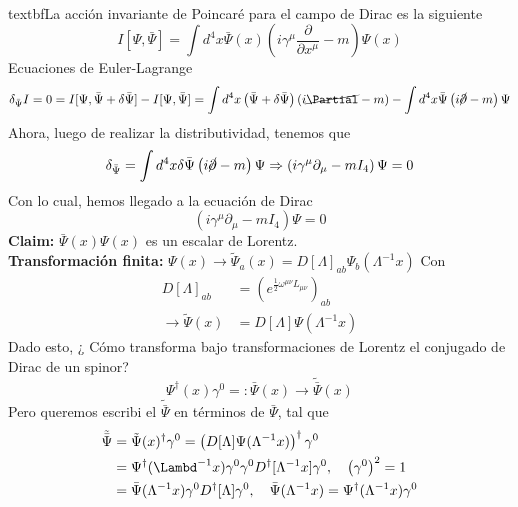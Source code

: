 \documentclass[../main.tex]{subfiles}
\begin{document}
 \\
 textbf{La acción invariante de Poincaré para el campo de Dirac es la siguiente}
 \begin{equation}
   \boxed{ I[\Psi, \bar{\Psi}] = \int d^4 x \bar{\Psi}(x) \left( i\gamma^\mu \frac{\partial}{\partial x^\mu} - m \right)\Psi(x) }
  \end{equation}
  Ecuaciones de Euler-Lagrange
  \begin{equation}
    \delta_{\bar{\Psi}} I = 0 = I[\Psi, \bar{\Psi} + \delta \bar{\Psi}] - I[\Psi,\bar{\Psi}] = \int d^4x \left( \bar{\Psi} + \delta \bar{\Psi} \right) \left( i \cancel{\Partial} - m \right)  - \int d^4 x\bar{\Psi} \left( i\cancel{\partial} - m \right)\Psi 
   \end{equation}
   Ahora, luego de realizar la distributividad, tenemos que
\begin{equation*}
  \delta_{\bar{\Psi}} = \int d^4 x \delta \bar{\Psi} \left( i\cancel{\partial} - m \right)\Psi \Rightarrow  \left( i \gamma^\mu \partial_\mu - m I_4  \right) \Psi = 0
\end{equation*} 
Con lo cual, hemos llegado a la ecuación de Dirac
\begin{equation}
  \boxed{ (i\gamma^\mu \partial_\mu - m I_4 ) \Psi = 0 }
 \end{equation}
 \textbf{Claim:} $\bar{\Psi}(x) \Psi(x)$ es un escalar de Lorentz. \\
 \textbf{Transformación finita:} $\Psi(x) \rightarrow \tilde{\Psi}_a(x) = D[\Lambda]_{ab} \Psi_b(\Lambda^{-1}x)$
 Con
 \begin{align*}
   D [\Lambda]_{ab} & = \left( e^{\frac{1}{2}\omega^{\mu \nu}L_{\mu \nu}} \right)_{ab} \\
   \rightarrow \tilde{\Psi}(x) & = D[\Lambda] \Psi(\Lambda^{-1}x)
 \end{align*}
 Dado esto, ¿ Cómo transforma bajo transformaciones de Lorentz el conjugado de Dirac de un spinor?
 \begin{equation*}
   \Psi^\dagger (x)\gamma^0 = : \bar{\Psi}(x) \rightarrow \tilde{\bar{\Psi}} (x)
 \end{equation*}
 Pero queremos escribi el $\tilde{\bar{\Psi}}$ en términos de $\bar{\Psi}$, tal que
 \begin{align*}
   \tilde{\bar{\Psi}} & = \tilde{\Psi}(x)^\dagger \gamma^0 = \left( D[\Lambda] \Psi(\Lambda^{-1}x) \right)^\dagger \gamma^0 \\
    & = \Psi^\dagger (\Lambd^{-1}x)\gamma^0 \gamma^0 D^\dagger[\Lambda^{-1}x] \gamma^0, \quad \left( \gamma^0 \right)^2 = 1 \\
    & = \bar{\Psi}(\Lambda^{-1}x) \gamma^0 D^\dagger[\Lambda] \gamma^0, \quad \bar{\Psi}(\Lambda^{-1}x) = \Psi^\dagger(\Lambda^{-1}x)\gamma^0
 \end{align*}
\end{document}
